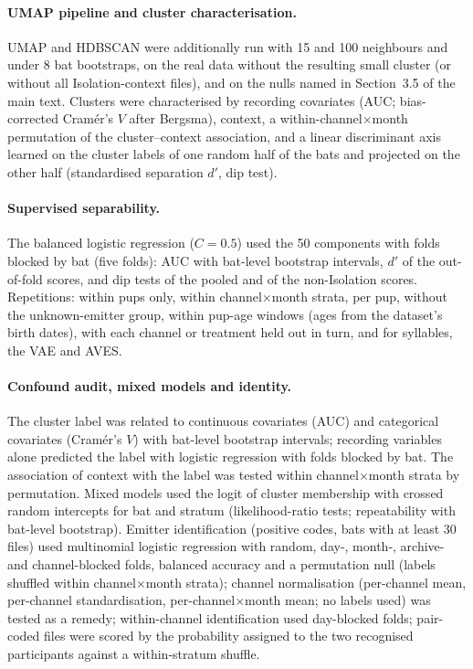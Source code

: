 \documentclass[11pt]{article}
\begin{document}
\paragraph{UMAP pipeline and cluster characterisation.} UMAP and HDBSCAN were additionally run with 15 and 100 neighbours and under 8 bat bootstraps, on the real data without the resulting small cluster (or without all Isolation-context files), and on the nulls named in Section~3.5 of the main text. Clusters were characterised by recording covariates (AUC; bias-corrected Cram\'er's $V$ after Bergsma), context, a within-channel$\times$month permutation of the cluster--context association, and a linear discriminant axis learned on the cluster labels of one random half of the bats and projected on the other half (standardised separation $d'$, dip test).

\paragraph{Supervised separability.} The balanced logistic regression ($C=0.5$) used the 50 components with folds blocked by bat (five folds): AUC with bat-level bootstrap intervals, $d'$ of the out-of-fold scores, and dip tests of the pooled and of the non-Isolation scores. Repetitions: within pups only, within channel$\times$month strata, per pup, without the unknown-emitter group, within pup-age windows (ages from the dataset's birth dates), with each channel or treatment held out in turn, and for syllables, the VAE and AVES.

\paragraph{Confound audit, mixed models and identity.} The cluster label was related to continuous covariates (AUC) and categorical covariates (Cram\'er's $V$) with bat-level bootstrap intervals; recording variables alone predicted the label with logistic regression with folds blocked by bat. The association of context with the label was tested within channel$\times$month strata by permutation. Mixed models used the logit of cluster membership with crossed random intercepts for bat and stratum (likelihood-ratio tests; repeatability with bat-level bootstrap). Emitter identification (positive codes, bats with at least 30 files) used multinomial logistic regression with random, day-, month-, archive- and channel-blocked folds, balanced accuracy and a permutation null (labels shuffled within channel$\times$month strata); channel normalisation (per-channel mean, per-channel standardisation, per-channel$\times$month mean; no labels used) was tested as a remedy; within-channel identification used day-blocked folds; pair-coded files were scored by the probability assigned to the two recognised participants against a within-stratum shuffle.
\end{document}
